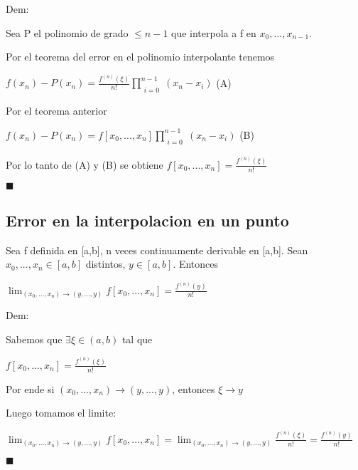 \documentclass{article}
\begin{document}
\vspace{5mm}

Dem:

Sea P el polinomio de grado $\leq n-1$ que interpola a f en $x_0,...,x_{n-1}$.

Por el teorema del error en el polinomio interpolante tenemos

$f(x_n)-P(x_n) = \displaystyle\frac{f^{(n)}(\xi)}{n!} \prod\limits_{\substack{i=0}}^{n-1} (x_n-x_i)$ (A)

\vspace{5mm}

Por el teorema anterior

$f(x_n)-P(x_n) = f[x_0,...,x_n]\prod\limits_{\substack{i=0}}^{n-1} (x_n-x_i)$ (B)

\vspace{5mm}

Por lo tanto de (A) y (B) se obtiene $f[x_0,...,x_n] = \displaystyle\frac{f^{(n)}(\xi)}{n!}$

 $\blacksquare$
 

\vspace{10mm}



\subsection{Error en la interpolacion en un punto}\label{Suavidad-Spline-cubico}

Sea f definida en [a,b], n veces continuamente derivable en [a,b]. Sean $x_0,...,x_n \in [a,b]$ distintos, $y \in [a,b]$. Entonces

$\lim_{{(x_0,...,x_n)} \to {(y,...,y)}}f[x_0,...,x_n] = \frac{f^{(n)}(y)}{n!}$

\vspace{5mm}

Dem:

Sabemos que $\exists \xi \in (a,b)$ tal que

$f[x_0,...,x_n] = \frac{f^{(n)}(\xi)}{n!}$

Por ende si $(x_0,...,x_n) \to (y,...,y)$, entonces $\xi \to y$

\vspace{5mm}

Luego tomamos el limite:

$\lim_{{(x_0,...,x_n)} \to {(y,...,y)}}f[x_0,...,x_n] = \lim_{{(x_0,...,x_n)} \to {(y,...,y)}}\frac{f^{(n)}(\xi)}{n!} = \frac{f^{(n)}(y)}{n!} $

$\blacksquare$
\end{document}
